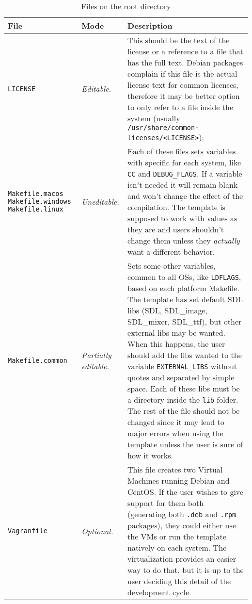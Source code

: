 \begin{longtabu} to \linewidth {XlX[2]}

\caption{Files on the root directory}\label{tab:files_root_dir}\\
\toprule
\textbf{File} & \textbf{Mode} & \textbf{Description} \\
\midrule
\endhead



\texttt{LICENSE} & \emph{Editable.} & This should be the text of the license or a reference to a file that has the full text. Debian packages complain if this file is the actual license text for common licenses, therefore it may be better option to only refer to a file inside the system (usually \texttt{/usr/share/common-licenses/<LICENSE>}); \\ \hline
\texttt{Makefile.macos} \texttt{Makefile.windows} \texttt{Makefile.linux} & \emph{Uneditable.} & Each of these files sets variables with specific for each system, like \texttt{CC} and \texttt{DEBUG\_FLAGS}. If a variable isn't needed it will remain blank and won't change the effect of the compilation. The template is supposed to work with values as they are and users shouldn't change them unless they \emph{actually} want a different behavior. \\ \hline
\texttt{Makefile.common} & \emph{Partially editable.} & Sets some other variables, common to all OSs, like \texttt{LDFLAGS}, based on each platform Makefile. The template has set default SDL libs (SDL, SDL\_image, SDL\_mixer, SDL\_ttf), but other external libs may be wanted. When this happens, the user should add the libs wanted to the variable \texttt{EXTERNAL\_LIBS} without quotes and separated by simple space. Each of these libs must be a directory inside the \texttt{lib} folder. The rest of the file should not be changed since it may lead to major errors when using the template unless the user is sure of how it works. \\ \hline
\texttt{Vagranfile} & \emph{Optional.} & This file creates two Virtual Machines running Debian and CentOS. If the user wishes to give support for them both (generating both \texttt{.deb} and \texttt{.rpm} packages), they could either use the VMs or run the template natively on each system. The virtualization provides an easier way to do that, but it is up to the user deciding this detail of the development cycle. \\ \hline

\end{longtabu}
